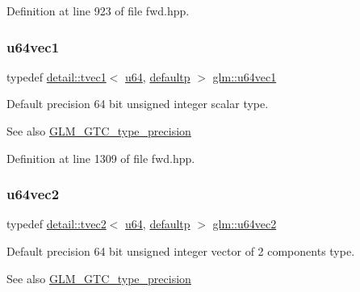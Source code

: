 Definition at line 923 of file fwd.\+hpp.

\mbox{\label{group__gtc__type__precision_ga7d5145019ad749f4becd39ce8e786a5f}} 
\subsubsection{\texorpdfstring{u64vec1}{u64vec1}}
{\footnotesize\ttfamily typedef \hyperlink{structglm_1_1detail_1_1tvec1}{detail\+::tvec1}$<$ \hyperlink{group__gtc__type__precision_ga71cedd4972f9cb1a5e14dfe5ab83ecd7}{u64}, \hyperlink{namespaceglm_a0f04f086094c747d227af4425893f545a9d21ccd8b5a009ec7eb7677befc3bf51}{defaultp} $>$ \hyperlink{group__gtc__type__precision_ga7d5145019ad749f4becd39ce8e786a5f}{glm\+::u64vec1}}

Default precision 64 bit unsigned integer scalar type. \begin{DoxySeeAlso}{See also}
\hyperlink{group__gtc__type__precision}{G\+L\+M\+\_\+\+G\+T\+C\+\_\+type\+\_\+precision} 
\end{DoxySeeAlso}


Definition at line 1309 of file fwd.\+hpp.

\mbox{\label{group__gtc__type__precision_gaffa78d655fd98b33e47043e2bd38641b}} 
\subsubsection{\texorpdfstring{u64vec2}{u64vec2}}
{\footnotesize\ttfamily typedef \hyperlink{structglm_1_1detail_1_1tvec2}{detail\+::tvec2}$<$ \hyperlink{group__gtc__type__precision_ga71cedd4972f9cb1a5e14dfe5ab83ecd7}{u64}, \hyperlink{namespaceglm_a0f04f086094c747d227af4425893f545a9d21ccd8b5a009ec7eb7677befc3bf51}{defaultp} $>$ \hyperlink{group__gtc__type__precision_gaffa78d655fd98b33e47043e2bd38641b}{glm\+::u64vec2}}

Default precision 64 bit unsigned integer vector of 2 components type. \begin{DoxySeeAlso}{See also}
\hyperlink{group__gtc__type__precision}{G\+L\+M\+\_\+\+G\+T\+C\+\_\+type\+\_\+precision} 
\end{DoxySeeAlso}


